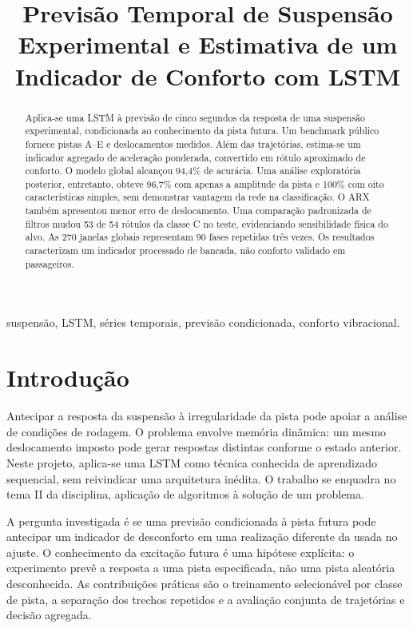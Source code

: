 \documentclass[conference]{IEEEtran}
\title{Previsão Temporal de Suspensão Experimental e Estimativa de um Indicador de Conforto com LSTM}
\author{\IEEEauthorblockN{Pedro Druck Montalvão Reis}\IEEEauthorblockA{Disciplina: Inteligência Artificial II}}
\begin{document}
\maketitle
\begin{abstract}
Aplica-se uma LSTM à previsão de cinco segundos da resposta de uma suspensão experimental, condicionada ao conhecimento da pista futura. Um benchmark público fornece pistas A--E e deslocamentos medidos. Além das trajetórias, estima-se um indicador agregado de aceleração ponderada, convertido em rótulo aproximado de conforto. O modelo global alcançou 94,4\% de acurácia. Uma análise exploratória posterior, entretanto, obteve 96,7\% com apenas a amplitude da pista e 100\% com oito características simples, sem demonstrar vantagem da rede na classificação. O ARX também apresentou menor erro de deslocamento. Uma comparação padronizada de filtros mudou 53 de 54 rótulos da classe C no teste, evidenciando sensibilidade física do alvo. As 270 janelas globais representam 90 fases repetidas três vezes. Os resultados caracterizam um indicador processado de bancada, não conforto validado em passageiros.
\end{abstract}
\begin{IEEEkeywords}
suspensão, LSTM, séries temporais, previsão condicionada, conforto vibracional.
\end{IEEEkeywords}

\section{Introdução}
Antecipar a resposta da suspensão à irregularidade da pista pode apoiar a análise de condições de rodagem. O problema envolve memória dinâmica: um mesmo deslocamento imposto pode gerar respostas distintas conforme o estado anterior. Neste projeto, aplica-se uma LSTM como técnica conhecida de aprendizado sequencial, sem reivindicar uma arquitetura inédita. O trabalho se enquadra no tema II da disciplina, aplicação de algoritmos à solução de um problema.

A pergunta investigada é se uma previsão condicionada à pista futura pode antecipar um indicador de desconforto em uma realização diferente da usada no ajuste. O conhecimento da excitação futura é uma hipótese explícita: o experimento prevê a resposta a uma pista especificada, não uma pista aleatória desconhecida. As contribuições práticas são o treinamento selecionável por classe de pista, a separação dos trechos repetidos e a avaliação conjunta de trajetórias e decisão agregada.
\end{document}
